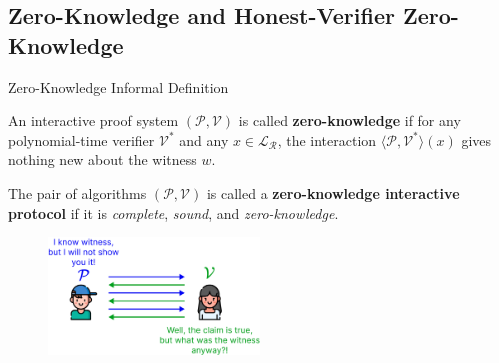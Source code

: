 \documentclass{zkdl-presentation-template}
\begin{document}
    \subsection{Zero-Knowledge and Honest-Verifier Zero-Knowledge}
    \begin{frame}{Zero-Knowledge Informal Definition}
        \begin{definition}
            An interactive proof system $(\mathcal{P}, \mathcal{V})$ is called \textbf{zero-knowledge} if for any polynomial-time verifier $\mathcal{V}^*$ and any $x \in \mathcal{L}_{\mathcal{R}}$, the interaction $\langle \mathcal{P}, \mathcal{V}^* \rangle(x)$ gives nothing new about the witness $w$.
        \end{definition}
        
        \begin{definition}
            The pair of algorithms $(\mathcal{P}, \mathcal{V})$ is called a \textbf{zero-knowledge interactive protocol} if it is \textit{complete}, \textit{sound}, and \textit{zero-knowledge}.
        \end{definition}

        \begin{figure}
            \centering
            \includegraphics[width=0.5\textwidth]{images/lecture_6/zk.pdf}
        \end{figure}
    \end{frame}
\end{document}
